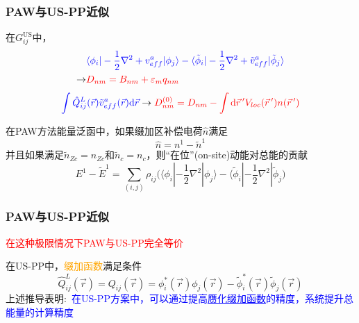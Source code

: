 \documentclass[cjk,slidestop,compress,mathserif,blue]{beamer}
\begin{document}
\frame
{
	\frametitle{\textrm{PAW}与\textrm{US-PP}近似}
	在$G_{ij}^{\mathrm{US}}$中，
	\begin{displaymath}
		\begin{aligned}
			&\textcolor{blue}{\langle\phi_i|-\frac12\nabla^2+v_{eff}^a|\phi_j\rangle-\langle\tilde\phi_i|-\frac12\nabla^2+\tilde v_{eff}^a|\tilde\phi_j\rangle}\\
			\rightarrow&\textcolor{red}{D_{nm}=B_{nm}+\varepsilon_mq_{nm}}
		\end{aligned}
	\end{displaymath}
	\begin{displaymath}
		\textcolor{blue}{\int\hat Q_{ij}^L(\vec r)\tilde v_{eff}^a(\vec r)\mathrm{d}\vec r}\rightarrow\textcolor{red}{D_{nm}^{(0)}=D_{nm}-\int\mathrm{d}\vec r\,^{\prime}V_{loc}(\vec r\,^{\prime})n(\vec r\,^{\prime})}
	\end{displaymath}

	在\textrm{PAW}方法能量泛函中，如果缀加区补偿电荷$\hat n$满足$$\hat n=n^1-\tilde n^1$$
	并且如果满足$\tilde n_{Zc}=n_{Zc}$和$\tilde n_c=n_c$，则“在位”(\textrm{on-site})动能对总能的贡献
	\begin{displaymath}
		E^1-\tilde E^1=\sum_{(i,j)}\rho_{ij}\big(\langle\phi_i|-\frac12\nabla^2|\phi_j\rangle-\langle\tilde\phi_i|-\frac12\nabla^2|\tilde\phi_j\big)
	\end{displaymath}
}

\frame
{
	\frametitle{\textrm{PAW}与\textrm{US-PP}近似}
	\textcolor{red}{在这种极限情况下\textrm{PAW}与\textrm{US-PP}完全等价}

	在\textrm{US-PP}中，\textcolor{orange}{缀加函数}满足条件
	$$\hat Q_{ij}^L(\vec r)=Q_{ij}(\vec r)=\phi_i^{\ast}(\vec r)\phi_j(\vec r)-\tilde\phi_i^{\ast}(\vec r)\tilde\phi_j(\vec r)$$
	上述推导表明:~\textcolor{blue}{在\textrm{US-PP}方案中，可以通过提高\underline{赝化缀加函数}的精度，系统提升总能量的计算精度}
}
\end{document}
